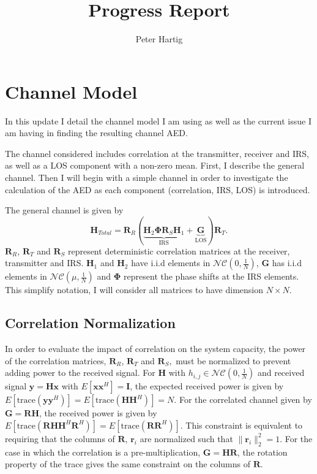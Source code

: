 \documentclass[12pt,a4paper]{report}
\title{Progress Report}
\author{Peter Hartig}
\begin{document}
\maketitle
\tableofcontents

\section{Channel Model}\label{section:channel}
In this update I detail the channel model I am using as well as the current issue I am having in finding the resulting channel AED. 
\par
The channel considered includes correlation at the transmitter, receiver and IRS, as well as a LOS component with a non-zero mean. First, I describe the general channel. Then I will begin with a simple channel in order to investigate the calculation of the AED as each component (correlation, IRS, LOS) is introduced. 
\par
The general channel is given by 
	\begin{equation}
	\mathbf{H}_{Total} = \mathbf{R}_{R}(\underbrace{\mathbf{H}_{2}\boldsymbol{\Phi}\mathbf{R}_{S}\mathbf{H}_{1}}_{\text{IRS}} + \underbrace{\mathbf{G}}_{\text{LOS}})\mathbf{R}_{T}.
	\end{equation}
	 $\mathbf{R}_{R}$, $\mathbf{R}_{T}$ and $\mathbf{R}_{S}$ represent deterministic correlation matrices at the receiver, transmitter and IRS. $\mathbf{H}_{1}$ and $\mathbf{H}_{2}$ have i.i.d elements in $\mathcal{NC}(0,\frac{1}{N})$, $\mathbf{G}$ has i.i.d elements in $\mathcal{NC}(\mu,\frac{1}{N})$ and $\boldsymbol{\Phi}$ represent the phase shifts at the IRS elements.
	This simplify notation, I will consider all matrices to have dimension $N \times N$. 

\subsection{Correlation Normalization}

In order to evaluate the impact of correlation on the system capacity, the power of the correlation matrices, $\mathbf{R}_{R}$, $\mathbf{R}_{T}$ and $\mathbf{R}_{S},$ must be normalized to prevent adding power to the received signal. For $\mathbf{H}$ with $h_{i,j} \in \mathcal{NC}(0,\frac{1}{N})$ and received signal $\mathbf{y} = \mathbf{H} \mathbf{x}$ with $E[\mathbf{x}\mathbf{x}^H] = \mathbf{I}$, the expected received power is given by 
$E[\text{trace}\left( \mathbf{y} \mathbf{y}^H \right) ]= E[\text{trace}\left(\mathbf{H} \mathbf{H}^H \right)] = N$.
For the correlated channel given by $\mathbf{G} = \mathbf{R}\mathbf{H}$, the received power is given by $E[\text{trace}\left(\mathbf{R} \mathbf{H} \mathbf{H}^H \mathbf{R}^H\right)] = E[\text{trace}\left(\mathbf{R}\mathbf{R}^H\right)] $. This constraint is equivalent to requiring that the columns of $\mathbf{R}$, $\mathbf{r}_i$ are normalized such that $\|\mathbf{r}_i\|^2_2 =1$. 
 For the case in which the correlation is a pre-multiplication, $\mathbf{G} = \mathbf{H}\mathbf{R}$, the rotation property of the trace gives the same constraint on the columns of 
 $\mathbf{R}$.
 
\end{document}
